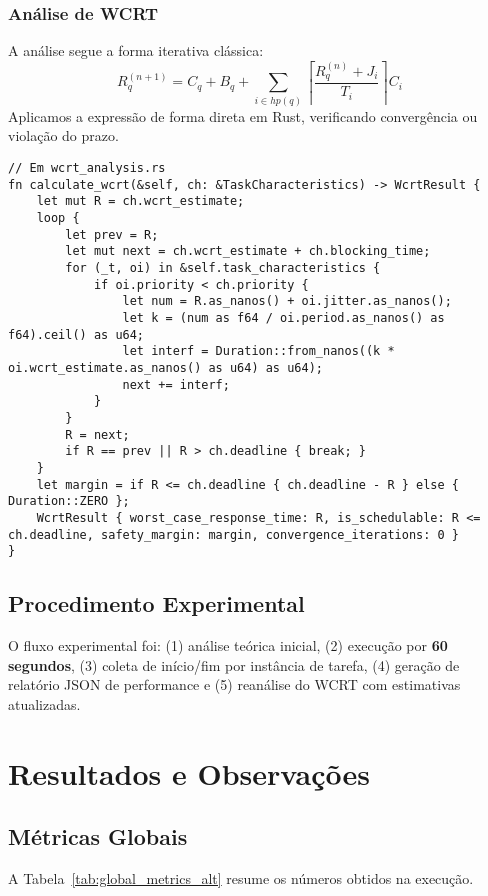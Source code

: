 \documentclass[conference]{IEEEtran}
\begin{document}
\subsubsection{Análise de WCRT}
A análise segue a forma iterativa clássica:
\begin{equation}
R_q^{(n+1)} = C_q + B_q + \sum_{i \in hp(q)} \left\lceil \frac{R_q^{(n)} + J_i}{T_i} \right\rceil C_i
\end{equation}
Aplicamos a expressão de forma direta em Rust, verificando convergência ou violação do prazo.

\begin{lstlisting}[caption={Iteração do WCRT conforme RTA.}, label={lst:wcrt_calc_alt}]
// Em wcrt_analysis.rs
fn calculate_wcrt(&self, ch: &TaskCharacteristics) -> WcrtResult {
    let mut R = ch.wcrt_estimate;
    loop {
        let prev = R;
        let mut next = ch.wcrt_estimate + ch.blocking_time;
        for (_t, oi) in &self.task_characteristics {
            if oi.priority < ch.priority {
                let num = R.as_nanos() + oi.jitter.as_nanos();
                let k = (num as f64 / oi.period.as_nanos() as f64).ceil() as u64;
                let interf = Duration::from_nanos((k * oi.wcrt_estimate.as_nanos() as u64) as u64);
                next += interf;
            }
        }
        R = next;
        if R == prev || R > ch.deadline { break; }
    }
    let margin = if R <= ch.deadline { ch.deadline - R } else { Duration::ZERO };
    WcrtResult { worst_case_response_time: R, is_schedulable: R <= ch.deadline, safety_margin: margin, convergence_iterations: 0 }
}
\end{lstlisting}

\subsection{Procedimento Experimental}
O fluxo experimental foi: (1) análise teórica inicial, (2) execução por \textbf{60 segundos}, (3) coleta de início/fim por instância de tarefa, (4) geração de relatório JSON de performance e (5) reanálise do WCRT com estimativas atualizadas.

\section{Resultados e Observações}
\subsection{Métricas Globais}
A Tabela~\ref{tab:global_metrics_alt} resume os números obtidos na execução.
\end{document}
